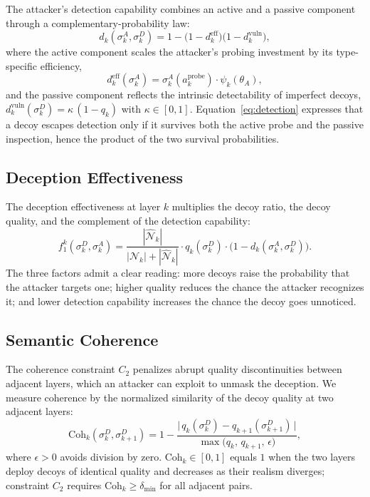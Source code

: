 \documentclass[conference]{IEEEtran}
\newcommand{\Coh}{\mathrm{Coh}}
\begin{document}
The attacker's detection capability combines an active and a passive component
through a complementary-probability law:
\begin{equation}
d_k(\sigma_k^A,\sigma_k^D) =
1 - \bigl(1-d_k^{\mathrm{eff}}\bigr)\bigl(1-d_k^{\mathrm{vuln}}\bigr),
\label{eq:detection}
\end{equation}
where the active component scales the attacker's probing investment by
its type-specific efficiency,
\begin{equation}
d_k^{\mathrm{eff}}(\sigma_k^A) = \sigma_k^A(a_k^{\mathrm{probe}})
\cdot \psi_k(\theta_A),
\end{equation}
and the passive component reflects the intrinsic detectability of
imperfect decoys, $d_k^{\mathrm{vuln}}(\sigma_k^D) = \kappa\,(1-q_k)$ with
$\kappa\in[0,1]$. Equation~\eqref{eq:detection} expresses that a decoy escapes
detection only if it survives both the active probe and the passive
inspection, hence the product of the two survival probabilities.

\subsection{Deception Effectiveness}

The deception effectiveness at layer $k$ multiplies the decoy ratio, the decoy
quality, and the complement of the detection capability:
\begin{equation}
f_1^k(\sigma_k^D,\sigma_k^A) =
\frac{|\hat{\mathcal{N}}_k|}{|\mathcal{N}_k|+|\hat{\mathcal{N}}_k|}
\cdot q_k(\sigma_k^D)\cdot\bigl(1-d_k(\sigma_k^A,\sigma_k^D)\bigr).
\label{eq:f1}
\end{equation}
The three factors admit a clear reading: more decoys raise the probability that
the attacker targets one; higher quality reduces the chance the attacker
recognizes it; and lower detection capability increases the chance the decoy
goes unnoticed.

\subsection{Semantic Coherence}

The coherence constraint $C_2$ penalizes abrupt quality discontinuities between
adjacent layers, which an attacker can exploit to unmask the deception. We
measure coherence by the normalized similarity of the decoy quality at two
adjacent layers:
\begin{equation}
\Coh_k(\sigma_k^D,\sigma_{k+1}^D) =
1 - \frac{\bigl|\,q_k(\sigma_k^D) - q_{k+1}(\sigma_{k+1}^D)\,\bigr|}
{\max\!\bigl(q_k,\,q_{k+1},\,\epsilon\bigr)},
\label{eq:coherence}
\end{equation}
where $\epsilon>0$ avoids division by zero. $\Coh_k\in[0,1]$ equals $1$ when the
two layers deploy decoys of identical quality and decreases as their realism
diverges; constraint $C_2$ requires $\Coh_k\geq\delta_{\min}$ for all adjacent
pairs.
\end{document}
